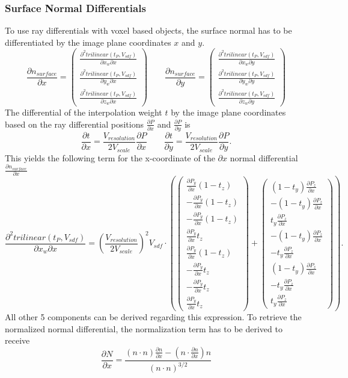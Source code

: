 \documentclass[12pt]{article}
\newcommand{\pardiff}[2]{\frac{\partial #1}{\partial #2} }
\newcommand{\pardiffsq}[3]{\frac{\partial^2 #1}{\partial #2 \partial #3} }
\newcommand{\pardiffx}[1]{\frac{\partial #1}{\partial x} }
\newcommand{\pardiffy}[1]{\frac{\partial #1}{\partial y} }
\newcommand{\newlinel}{\\[0.3em]}
\newcommand{\newlinell}{\\[0.6em]}
\begin{document}
\subsubsection{Surface Normal Differentials}
To use ray differentials with voxel based objects, the surface normal has to be differentiated by the image plane coordinates $x$ and $y$.
\begin{equation}
\pardiffx{n_{surface}} = 
\begin{pmatrix}
\pardiffsq{trilinear(t_P, V_{sdf})}{x_{w}}{x} \newlinell
\pardiffsq{trilinear(t_P, V_{sdf})}{y_{w}}{x} \newlinell
\pardiffsq{trilinear(t_P, V_{sdf})}{z_{w}}{x}
\end{pmatrix}
\qquad
\pardiffy{n_{surface}} = 
\begin{pmatrix}
\pardiffsq{trilinear(t_P, V_{sdf})}{x_{w}}{y} \newlinell
\pardiffsq{trilinear(t_P, V_{sdf})}{y_{w}}{y} \newlinell
\pardiffsq{trilinear(t_P, V_{sdf})}{z_{w}}{y}
\end{pmatrix}
\end{equation}
The differential of the interpolation weight $t$ by the image plane coordinates based on the ray differential positions $\pardiffx{P}$ and $\pardiffy{P}$ is
\begin{equation}
\pardiff{t}{x} = \frac{V_{resolution}}{2V_{scale}} \pardiff{P}{x}
\qquad
\pardiff{t}{y} = \frac{V_{resolution}}{2V_{scale}} \pardiff{P}{y}.
\end{equation}
This yields the following term for the x-coordinate of the $\partial x$ normal differential $\pardiffx{n_{surface}}$
\begin{equation}
\pardiffsq{trilinear(t_P, V_{sdf})}{x_{w}}{x} = 
\left(\frac{V_{resolution}}{2V_{scale}}\right)^2
V_{sdf}
\cdot
\left(
\begin{pmatrix}
\pardiffx{P_y} (1 - t_z) \newlinel
-\pardiffx{P_y} (1 - t_z) \newlinel
-\pardiffx{P_y} (1 - t_z) \newlinel
\pardiffx{P_y} t_z \newlinel
\pardiffx{P_y} (1 - t_z) \newlinel
-\pardiffx{P_y} t_z \newlinel
-\pardiffx{P_y} t_z \newlinel
\pardiffx{P_y} t_z
\end{pmatrix}
+
\begin{pmatrix}
(1 - t_y) \pardiffx{P_z} \newlinel
-(1 - t_y) \pardiffx{P_z} \newlinel
t_y \pardiffx{P_z} \newlinel
-(1 - t_y) \pardiffx{P_z} \newlinel
-t_y \pardiffx{P_z} \newlinel
(1 - t_y) \pardiffx{P_z} \newlinel
-t_y \pardiffx{P_z} \newlinel
t_y \pardiffx{P_z}
\end{pmatrix}
\right).
\end{equation}
All other 5 components can be derived regarding this expression. To retrieve the normalized normal differential, the normalization term has to be derived to receive
\begin{equation}
\pardiffx{N} = \frac{(n \cdot n) \pardiffx{n} - (n \cdot \pardiffx{n}) n}{(n \cdot n)^{3/2}}
\end{equation}
\end{document}
